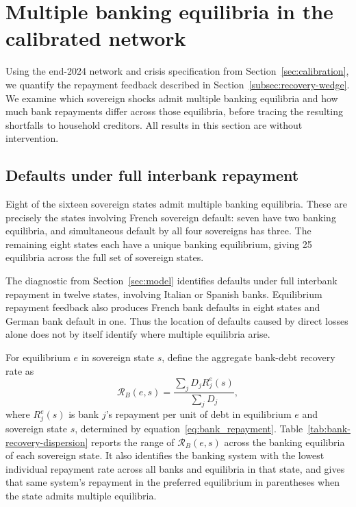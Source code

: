 \documentclass[preprint,12pt,authoryear]{elsarticle}
\begin{document}
\section{Multiple banking equilibria in the calibrated network}
\label{sec:multiple-equilibria}

Using the end-2024 network and crisis specification from Section~\ref{sec:calibration}, we quantify the repayment feedback described in Section~\ref{subsec:recovery-wedge}. We examine which sovereign shocks admit multiple banking equilibria and how much bank repayments differ across those equilibria, before tracing the resulting shortfalls to household creditors. All results in this section are without intervention.

\subsection{Defaults under full interbank repayment}

Eight of the sixteen sovereign states admit multiple banking equilibria. These are precisely the states involving French sovereign default: seven have two banking equilibria, and simultaneous default by all four sovereigns has three. The remaining eight states each have a unique banking equilibrium, giving 25 equilibria across the full set of sovereign states.

The diagnostic from Section~\ref{sec:model} identifies defaults under full interbank repayment in twelve states, involving Italian or Spanish banks. Equilibrium repayment feedback also produces French bank defaults in eight states and German bank default in one. Thus the location of defaults caused by direct losses alone does not by itself identify where multiple equilibria arise.

For equilibrium $e$ in sovereign state $s$, define the
aggregate bank-debt recovery rate as
\[
 \mathcal R_B(e,s)
 =\frac{\sum_jD_jR_j^e(s)}{\sum_jD_j},
\]
where $R_j^e(s)$ is bank $j$'s repayment per unit of debt in equilibrium $e$ and sovereign state $s$, determined by equation~\eqref{eq:bank_repayment}.
Table~\ref{tab:bank-recovery-dispersion} reports the range of
$\mathcal R_B(e,s)$ across the banking equilibria of each sovereign state.
It also identifies the banking system with the lowest individual repayment
rate across all banks and equilibria in that state, and gives that same
system's repayment in the preferred equilibrium in parentheses when the state admits multiple equilibria.
\end{document}
